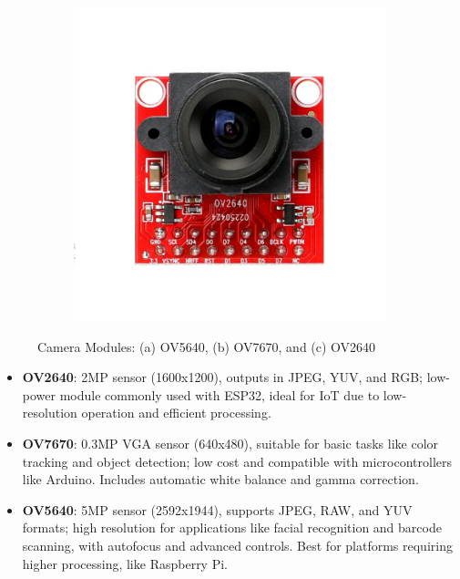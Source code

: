 \begin{figure}[h!]
\begin{subfigure}[b]{0.3\textwidth}
		\caption{}
		\label{fig:ov7670}
	\end{subfigure}
	\hfill
	\begin{subfigure}[b]{0.3\textwidth}
		\centering
		\includegraphics[width=\linewidth]{assets/ch2/OV2640}
		\caption{}
		\label{fig:ov2640}
	\end{subfigure}
	\caption{Camera Modules: (a) OV5640, (b) OV7670, and (c) OV2640}
	\label{fig:camera_modules}
\end{figure}


\begin{itemize}
	\item \textbf{OV2640}: 2MP sensor (1600x1200), outputs in JPEG, YUV, and RGB; low-power module commonly used with ESP32, ideal for IoT due to low-resolution operation and efficient processing. \cite{OV2640}
	
	\item \textbf{OV7670}: 0.3MP VGA sensor (640x480), suitable for basic tasks like color tracking and object detection; low cost and compatible with microcontrollers like Arduino. Includes automatic white balance and gamma correction. \cite{OV7670}
	
	\item \textbf{OV5640}: 5MP sensor (2592x1944), supports JPEG, RAW, and YUV formats; high resolution for applications like facial recognition and barcode scanning, with autofocus and advanced controls. Best for platforms requiring higher processing, like Raspberry Pi. \cite{OV5640}
\end{itemize}







